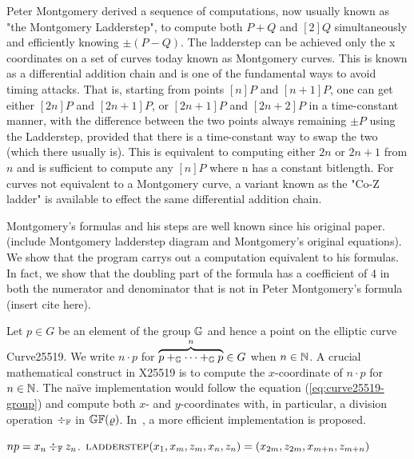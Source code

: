Peter Montgomery derived a sequence of computations, now usually known
as "the Montgomery Ladderstep", to compute both $P+Q$ and $[2]Q$
simultaneously and efficiently knowing $\pm(P-Q)$.  The ladderstep can
be achieved only the x coordinates on a set of curves today known as
Montgomery curves. This is known as a differential addition chain and
is one of the fundamental ways to avoid timing attacks.  That is,
starting from points $[n]P$ and $[n+1]P$, one can get either $[2n]P$
and $[2n+1]P$, or $[2n+1]P$ and $[2n+2]P$ in a time-constant manner,
with the difference between the two points always remaining $\pm P$
using the Ladderstep, provided that there is a time-constant way to
swap the two (which there usually is).   This is equivalent to
computing either $2n$ or $2n+1$ from $n$ and is sufficient to compute
any $[n]P$ where n has a constant bitlength.   For curves not
equivalent to a Montgomery curve, a variant known as the "Co-Z ladder"
is available to effect the same differential addition chain. 

Montgomery's formulas and his steps are well known since his original
paper.  (include Montgomery ladderstep diagram and Montgomery's
original equations).  We show that the program carrys out a
computation equivalent to his formulas.  In fact, we show that the
doubling part of the formula has a coefficient of 4 in both the
numerator and denominator that is not in Peter Montgomery's formula
(insert cite here). 

Let $p \in G$ be an element of the group $\mathbb{G}$ and hence a point on
the elliptic curve Curve25519. We write $n \cdot p$ for
$\overbrace{p +_{\mathbb{G}} \cdots +_{\mathbb{G}} p}^n \in G$ when $n \in \mathbb{N}$. A
crucial mathematical construct in X25519 is to compute the
$x$-coordinate of $n \cdot p$ for $n \in \mathbb{N}$. The na\"ive
implementation would follow the equation (\ref{eq:curve25519-group})
and compute both $x$- and $y$-coordinates with, in particular, a
division operation $\div_{\mathbb{F}}$ in $\mathbb{GF}(\varrho)$. In~\cite{M:87:SPEC},
a more efficient implementation is proposed. 

$np = x_n \div_{\mathbb{F}} z_n$.
$\textsc{ladderstep} (x_1, x_m, z_m, x_n, z_n) = (x_{2m}, z_{2m},
x_{m+n}, z_{m+n})$
 
